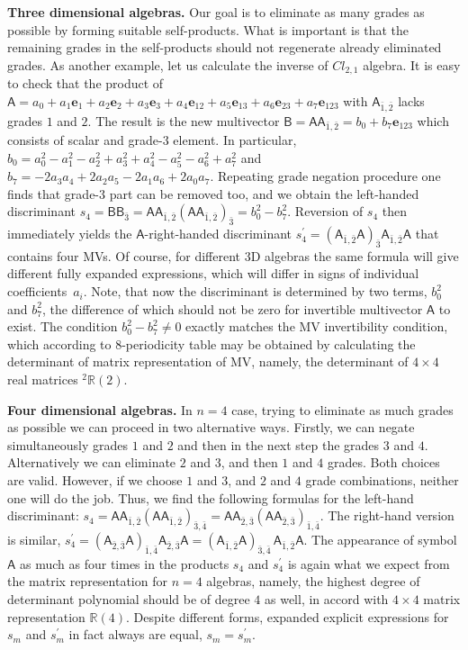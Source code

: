 \documentclass{birkjour}
\newcommand{\e}[1]{\mathbf{e}_{#1}} %
\def\m#1{\mathsf{#1}} %
\begin{document}
{\bf Three dimensional algebras.}  Our goal is to eliminate as
many grades as possible by forming suitable self-products. What is
important is that the remaining grades in the self-products should
not regenerate already eliminated grades. As another example, let
us  calculate the inverse of $Cl_{2,1}$ algebra. It is easy to
check that the product of $\m{A}=a_{0}+a_{1} \e{1}+a_{2}
\e{2}+a_{3} \e{3}+a_{4} \e{12}+a_{5} \e{13}+a_{6} \e{23}+a_{7}
\e{123}$ with $\m{A}_{\bar 1,\bar 2}$ lacks grades $1$ and $2$.
The result is the new multivector $\m{B}=\m{A} \m{A}_{\bar 1,\bar
2}= b_{0}+b_{7} \e{123}$ which  consists of scalar and grade-$3$
element. In particular, $b_0=a_{0}^2 - a_{1}^2 - a_{2}^2 + a_{3}^2
+ a_{4}^2 - a_{5}^2 - a_{6}^2 + a_{7}^2$ and $b_7=-2 a_{3} a_{4} +
2 a_{2} a_{5} - 2 a_{1} a_{6} + 2 a_{0} a_{7}$. Repeating  grade
negation procedure one finds that grade-$3$ part can be removed
too, and we obtain the left-handed discriminant $s_4=\m{B}
\m{B}_{\bar 3}=\m{A} \m{A}_{\bar 1,\bar 2}(\m{A} \m{A}_{\bar
1,\bar 2})_{\bar 3}=b_0^2 - b_7^2$. Reversion of $s_4$ then
immediately yields the $\m{A}$-right-handed discriminant
$s_4^\prime=(\m{A}_{\bar 1,\bar 2}\m{A})_{\bar 3} \m{A}_{\bar
1,\bar 2}\m{A}$ that contains four MVs. Of course, for different
3D algebras the same formula will give different fully expanded
expressions, which will differ in signs of individual
coefficients~$a_i$. Note, that now the discriminant is determined
by two terms, $b_0^2$ and $b_7^2$, the difference of which should
not be zero for invertible multivector $\m{A}$ to exist. The
condition $b_0^2-b_7^2\ne 0$ exactly matches the MV invertibility
condition, which  according to 8-periodicity table may be obtained
by calculating the determinant of matrix representation of MV,
namely, the determinant of $4\times 4$ real matrices
${^2\mathbb{R}(2)}$.

{\bf Four dimensional algebras.} In $n=4$ case, trying to
eliminate as much grades as possible  we can proceed in two
alternative ways. Firstly, we can negate simultaneously grades $1$
and $2$ and then in the next step the grades $3$ and $4$.
Alternatively  we can eliminate $2$ and $3$, and then $1$ and $4$
grades. Both choices are valid. However, if we choose  $1$ and
$3$, and  $2$ and $4$ grade combinations, neither one will  do the
job. Thus, we find the following formulas for the left-hand
discriminant: $s_4= \m{A}\m{A}_{\bar{1},\bar{2}}(\m{A}
\m{A}_{\bar{1},\bar{2}})_{\bar{3},\bar{4}}= \m{A}
\m{A}_{\bar{2},\bar{3}}
(\m{A}\m{A}_{\bar{2},\bar{3}})_{\bar{1},\bar{4}}$. The right-hand
version  is similar,
$s_4^\prime=(\m{A}_{\bar{2},\bar{3}}\m{A})_{\bar{1},\bar{4}}\m{A}_{\bar{2},\bar{3}}
\m{A}=
(\m{A}_{\bar{1},\bar{2}}\m{A})_{\bar{3},\bar{4}}\,\m{A}_{\bar{1},\bar{2}}
\m{A}$.  The appearance of symbol $\m{A}$ as much as four times in
the products $s_4$ and  $s_4^{\prime}$ is again what we expect
from the matrix representation for $n=4$ algebras, namely, the
highest degree of determinant polynomial should be of degree $4$
as well, in accord with $4\times 4$ matrix representation
$\mathbb{R}(4)$. Despite different forms, expanded explicit
expressions for $s_m$ and $s_m^\prime$ in fact always are equal,
$s_m=s_m^\prime$.
\end{document}
